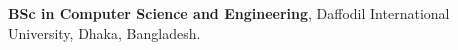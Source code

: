 %
%
%


\begin{scholarship}
					{\textbf{BSc in Computer Science and Engineering}, Daffodil International University, Dhaka, Bangladesh.}
	\emptySeparator
\end{scholarship}